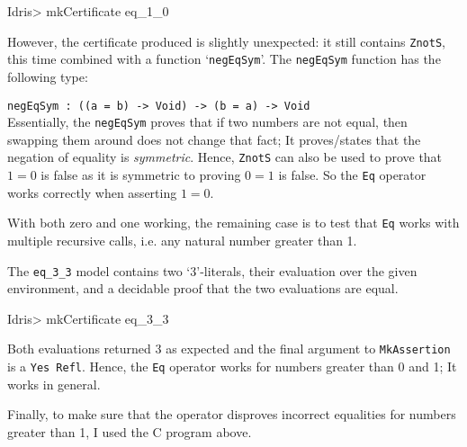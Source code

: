         \begin{code}
Idris> mkCertificate eq_1_0
        \end{code}
        
        However, the certificate produced is slightly unexpected: it still contains \texttt{ZnotS}, this time combined with a function `\texttt{negEqSym}'. The \texttt{negEqSym} function has the following type:\par
        \texttt{negEqSym : ((a = b) -> Void) -> (b = a) -> Void}\\
        Essentially, the \texttt{negEqSym} proves that if two numbers are not equal, then swapping them around does not change that fact; It proves/states that the negation of equality is \textit{symmetric}. Hence, \texttt{ZnotS} can also be used to prove that $1 = 0$ is false as it is symmetric to proving $0 = 1$ is false. So the \texttt{Eq} operator works correctly when asserting $1 = 0$.
        
        
        
        With both zero and one working, the remaining case is to test that \texttt{Eq} works with multiple recursive calls, i.e. any natural number greater than 1.
        
        \newpage
        
        
        The \texttt{eq\_3\_3} model contains two `3'-literals, their evaluation over the given environment, and a decidable proof that the two evaluations are equal.
        
        \begin{code}
Idris> mkCertificate eq_3_3
        \end{code}
        
        Both evaluations returned 3 as expected and the final argument to \texttt{MkAssertion} is a \texttt{Yes Refl}. Hence, the \texttt{Eq} operator works for numbers greater than 0 and 1; It works in general.
        
        
        
        Finally, to make sure that the operator disproves incorrect equalities for numbers greater than 1, I used the C program above.
        
